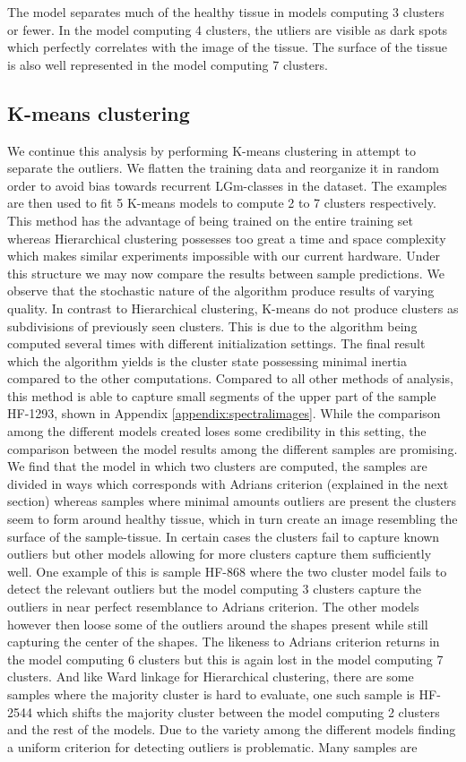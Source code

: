  The model separates much of the healthy tissue in models computing 3 clusters or fewer. In the model computing 4 clusters, the utliers are visible as dark spots which perfectly correlates with the image of the tissue. The surface of the tissue is also well represented in the model computing 7 clusters.

\subsection{K-means clustering}

We continue this analysis by performing K-means clustering in attempt to separate the outliers. We flatten the training data and reorganize it in random order to avoid bias towards recurrent LGm-classes in the dataset. The examples are then used to fit 5 K-means models to compute 2 to 7 clusters respectively. This method has the advantage of being trained on the entire training set whereas Hierarchical clustering possesses too great a time and space complexity which makes similar experiments impossible with our current hardware. Under this structure we may now compare the results between sample predictions. We observe that the stochastic nature of the algorithm produce results of varying quality. In contrast to Hierarchical clustering, K-means do not produce clusters as subdivisions of previously seen clusters. This is due to the algorithm being computed several times with different initialization settings. The final result which the algorithm yields is the cluster state possessing minimal inertia compared to the other computations. Compared to all other methods of analysis, this method is able to capture small segments of the upper part of the sample HF-1293, shown in Appendix \ref{appendix:spectralimages}. While the comparison among the different models created loses some credibility in this setting, the comparison between the model results among the different samples are promising. We find that the model in which two clusters are computed, the samples are divided in ways which corresponds with Adrians criterion (explained in the next section) whereas samples where minimal amounts outliers are present the clusters seem to form around healthy tissue, which in turn create an image resembling the surface of the sample-tissue. In certain cases the clusters fail to capture known outliers but other models allowing for more clusters capture them sufficiently well. One example of this is sample HF-868 where the two cluster model fails to detect the relevant outliers but the model computing 3 clusters capture the outliers in near perfect resemblance to Adrians criterion. The other models however then loose some of the outliers around the shapes present while still capturing the center of the shapes. The likeness to Adrians criterion returns in the model computing 6 clusters but this is again lost in the model computing 7 clusters. And like Ward linkage for Hierarchical clustering, there are some samples where the majority cluster is hard to evaluate, one such sample is HF-2544 which shifts the majority cluster between the model computing 2 clusters and the rest of the models. Due to the variety among the different models finding a uniform criterion for detecting outliers is problematic. Many samples are 